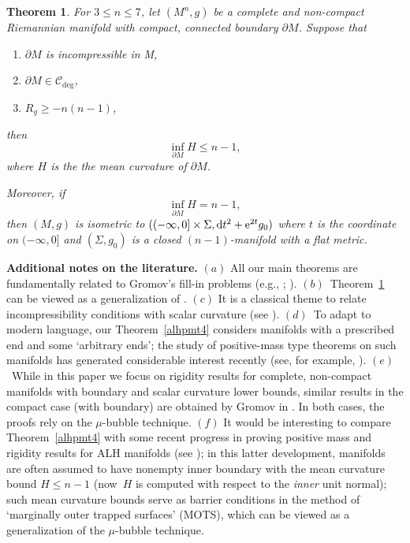 \documentclass[10pt,a4paper]{amsart}
\numberwithin{equation}{section}
\newtheorem{Theorem}{Theorem}[section]
\def\Ccal{\mathcal{C}}
\def\ed{{\rm d}}
\begin{document}
\begin{Theorem}\label{alhpmt1}
For $3\leq n\leq 7$, let $(M^n, g)$ be a complete and non-compact Riemannian manifold with compact, connected boundary $\partial M$. Suppose that
\begin{enumerate}\itemsep=0pt
\item[$(a)$] $\partial M$ is incompressible in M,
\item[$(b)$] $\partial M\in\Ccal_{\deg}$,
\item[$(c)$]  $R_g\geq -n(n-1)$,
\end{enumerate} then
\begin{equation*}%
\inf_{\partial M}H \leq n-1,
\end{equation*}
where $H$ is the the mean curvature of $\partial M$.

Moreover, if
\[
\inf_{\partial M}H = n-1,
\]
then $(M, g)$ is isometric to $((-\infty, 0]\times \Sigma, \ed t^2+{\rm e}^{2t}g_0)$ where $t$ is the coordinate on $(-\infty, 0]$ and $(\Sigma, g_0)$ is a closed
$(n-1)$-manifold with a flat metric.
\end{Theorem}


\noindent\textbf{Additional notes on the literature.}
$(a)$ All our main theorems are fundamentally related to Gromov's fill-in problems
	(e.g., \cite[Problems A and B]{Gr2019}; \cite[p.~234, Question~(c)]{Gr2021}).
$(b)$~Theorem~\ref{alhpmt1} can be viewed as a generalization of \cite[Theorem~3.2]{Yau2001}.
$(c)$ It is a classical theme to relate incompressibility conditions with scalar curvature (see \cite[Section~11]{GL1983}).
$(d)$~To adapt to modern language, our Theorem~\ref{alhpmt4} considers manifolds with a prescribed end
and some `arbitrary ends'; the study of positive-mass type theorems on such manifolds has generated
considerable interest recently (see, for example, \cite{CZ21pmt,CL20,LUY21,Zhu22PMT}).
$(e)$~While in this paper we focus on rigidity results for complete, non-compact
manifolds with boundary and scalar curvature lower bounds, similar results in the
compact case (with boundary) are obtained by Gromov in \cite[Section~4]{Gr2019}.
In both cases, the proofs rely on the $\mu$-bubble technique.
$(f)$ It would be interesting to compare Theorem~\ref{alhpmt4}
with some recent progress in proving positive mass and rigidity results for
ALH manifolds (see \cite{AHK2022,CG2021,CGNP2018,HJ2022});
in this latter development, manifolds are often assumed to have nonempty inner boundary with the
mean curvature bound $H\le n-1$ (now~$H$ is computed with respect to the \emph{inner} unit normal);
 such mean curvature bounds serve as barrier conditions in the method of `marginally outer
trapped surfaces' (MOTS), which can be viewed as a generalization of the $\mu$-bubble technique.
\end{document}
